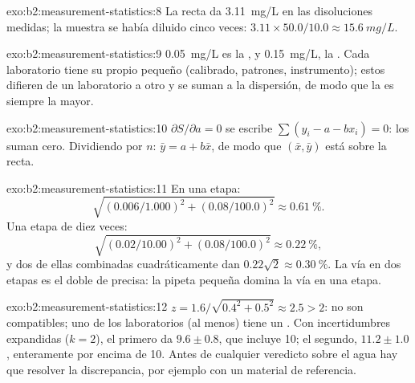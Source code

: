 \begin{solution}{exo:b2:measurement-statistics:8}
La recta da \qty{3.11}{mg/L} en las disoluciones medidas; la muestra se había diluido cinco veces:
$3.11 \times 50.0/10.0 \approx \qty{15.6}{mg/L}$.
\end{solution}

\begin{solution}{exo:b2:measurement-statistics:9}
\qty{0.05}{mg/L} es la , y \qty{0.15}{mg/L}, la . Cada laboratorio tiene su
propio pequeño  (calibrado, patrones, instrumento); estos  difieren de un laboratorio a otro y se suman
a la dispersión, de modo que la  es siempre la mayor.
\end{solution}

\begin{solution}{exo:b2:measurement-statistics:10}
$\partial S/\partial a = 0$ se escribe $\sum(y_i - a - bx_i) = 0$: los  suman cero. Dividiendo por
$n$: $\bar y = a + b\bar x$, de modo que $(\bar x, \bar y)$ está sobre la recta.
\end{solution}

\begin{solution}{exo:b2:measurement-statistics:11}
En una etapa:
\[\sqrt{(0.006/1.000)^2 + (0.08/100.0)^2} \approx 0.61~\%.\]
Una etapa de diez veces:
\[\sqrt{(0.02/10.00)^2 + (0.08/100.0)^2} \approx 0.22~\%,\]
y dos de ellas combinadas cuadráticamente dan $0.22\sqrt2 \approx 0.30~\%$. La vía en dos etapas es el doble de precisa: la pipeta pequeña domina la vía
en una etapa.
\end{solution}

\begin{solution}{exo:b2:measurement-statistics:12}
$z = 1.6/\sqrt{0.4^2 + 0.5^2} \approx 2.5 > 2$: no son compatibles; uno de los laboratorios (al menos) tiene un .
Con incertidumbres expandidas ($k = 2$), el primero da $9.6 \pm 0.8$, que incluye 10; el segundo,
$11.2 \pm 1.0$, enteramente por encima de 10. Antes de cualquier veredicto sobre el agua hay que resolver la discrepancia,
por ejemplo con un material de referencia.
\end{solution}

